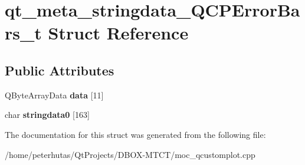 \hypertarget{structqt__meta__stringdata___q_c_p_error_bars__t}{}\section{qt\+\_\+meta\+\_\+stringdata\+\_\+\+Q\+C\+P\+Error\+Bars\+\_\+t Struct Reference}
\label{structqt__meta__stringdata___q_c_p_error_bars__t}
\subsection*{Public Attributes}
\begin{DoxyCompactItemize}
\item 
\mbox{\label{structqt__meta__stringdata___q_c_p_error_bars__t_a806cc685f8b46afdca68d6d320f2450b}} 
Q\+Byte\+Array\+Data {\bfseries data} \mbox{[}11\mbox{]}
\item 
\mbox{\label{structqt__meta__stringdata___q_c_p_error_bars__t_a651dca586cf4ad7d2d0c36d8723c59b2}} 
char {\bfseries stringdata0} \mbox{[}163\mbox{]}
\end{DoxyCompactItemize}


The documentation for this struct was generated from the following file\+:\begin{DoxyCompactItemize}
\item 
/home/peterhutas/\+Qt\+Projects/\+D\+B\+O\+X-\/\+M\+T\+C\+T/moc\+\_\+qcustomplot.\+cpp\end{DoxyCompactItemize}
